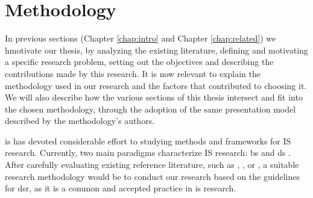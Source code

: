 \chapter{Methodology}
\label{chap:methods}

In previous sections (Chapter \ref{chap:intro} and Chapter \ref{chap:related}) we hmotivate our thesis, by analyzing the existing literature, defining and motivating a specific research problem, setting out the objectives and describing the contributions made by this research. It is now relevant to explain the methodology used in our research and the factors that contributed to choosing it. We will also describe how the various sections of this thesis intersect and fit into the chosen methodology, through the adoption of the same presentation model described by the methodology's authors.

\gls{is} has devoted considerable effort to studying methods and frameworks for IS research. Currently, two main paradigms characterize IS research: \gls{bs} and \gls{ds} \cite[76]{hevner_design_2004}. After carefully evaluating existing reference literature, such as \cite{hevner_design_2004}, \cite{march_design_1995}, \cite{winter_design_2008} or \cite{peffers_design_2007}, a suitable research methodology would be to conduct our research based on the guidelines for \gls{dsr}, as it is a common and accepted practice in \gls{is} research.

